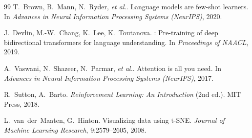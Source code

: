 \documentclass[12pt,a4paper]{ctexart}
\theoremstyle{remark}
\newcommand{\etal}{\textit{et al.}}
\begin{document}
\begin{thebibliography}{99}
T.~Brown, B.~Mann, N.~Ryder, \etal.
\newblock Language models are few-shot learners.
\newblock In \textit{Advances in Neural Information Processing Systems (NeurIPS)}, 2020.

J.~Devlin, M.-W.~Chang, K.~Lee, K.~Toutanova.
: Pre-training of deep bidirectional transformers for language understanding.
\newblock In \textit{Proceedings of NAACL}, 2019.

A.~Vaswani, N.~Shazeer, N.~Parmar, \etal.
\newblock Attention is all you need.
\newblock In \textit{Advances in Neural Information Processing Systems (NeurIPS)}, 2017.

R.~Sutton, A.~Barto.
\newblock \textit{Reinforcement Learning: An Introduction} (2nd ed.).
\newblock MIT Press, 2018.

L.~van~der~Maaten, G.~Hinton.
\newblock Visualizing data using {t-SNE}.
\newblock \textit{Journal of Machine Learning Research}, 9:2579--2605, 2008.

\end{thebibliography}
\end{document}
